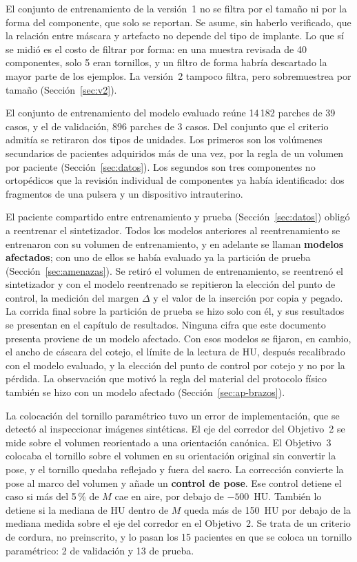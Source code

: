 El conjunto de entrenamiento de la versión~1 no se filtra por el tamaño ni por la forma del componente, que solo se reportan. Se asume, sin haberlo verificado, que la relación entre máscara y artefacto no depende del tipo de implante. Lo que sí se midió es el costo de filtrar por forma: en una muestra revisada de 40 componentes, solo 5 eran tornillos, y un filtro de forma habría descartado la mayor parte de los ejemplos. La versión~2 tampoco filtra, pero sobremuestrea por tamaño (Sección~\ref{sec:v2}).

El conjunto de entrenamiento del modelo evaluado reúne 14\,182 parches de 39 casos, y el de validación, 896 parches de 3 casos. Del conjunto que el criterio admitía se retiraron dos tipos de unidades. Los primeros son los volúmenes secundarios de pacientes adquiridos más de una vez, por la regla de un volumen por paciente (Sección~\ref{sec:datos}). Los segundos son tres componentes no ortopédicos que la revisión individual de componentes ya había identificado: dos fragmentos de una pulsera y un dispositivo intrauterino.

El paciente compartido entre entrenamiento y prueba (Sección~\ref{sec:datos}) obligó a reentrenar el sintetizador. Todos los modelos anteriores al reentrenamiento se entrenaron con su volumen de entrenamiento, y en adelante se llaman \textbf{modelos afectados}; con uno de ellos se había evaluado ya la partición de prueba (Sección~\ref{sec:amenazas}). Se retiró el volumen de entrenamiento, se reentrenó el sintetizador y con el modelo reentrenado se repitieron la elección del punto de control, la medición del margen $\Delta$ y el valor de la inserción por copia y pegado. La corrida final sobre la partición de prueba se hizo solo con él, y sus resultados se presentan en el capítulo de resultados. Ninguna cifra que este documento presenta proviene de un modelo afectado. Con esos modelos se fijaron, en cambio, el ancho de cáscara del cotejo, el límite de la lectura de HU, después recalibrado con el modelo evaluado, y la elección del punto de control por cotejo y no por la pérdida. La observación que motivó la regla del material del protocolo físico también se hizo con un modelo afectado (Sección~\ref{sec:ap-brazos}).

La colocación del tornillo paramétrico tuvo un error de implementación, que se detectó al inspeccionar imágenes sintéticas. El eje del corredor del Objetivo~2 se mide sobre el volumen reorientado a una orientación canónica. El Objetivo~3 colocaba el tornillo sobre el volumen en su orientación original sin convertir la pose, y el tornillo quedaba reflejado y fuera del sacro. La corrección convierte la pose al marco del volumen y añade un \textbf{control de pose}. Ese control detiene el caso si más del 5\,\% de $M$ cae en aire, por debajo de $-500$~HU. También lo detiene si la mediana de HU dentro de $M$ queda más de 150~HU por debajo de la mediana medida sobre el eje del corredor en el Objetivo~2. Se trata de un criterio de cordura, no preinscrito, y lo pasan los 15 pacientes en que se coloca un tornillo paramétrico: 2 de validación y 13 de prueba.

